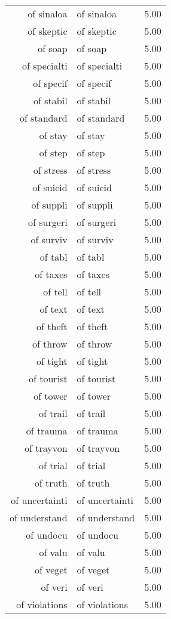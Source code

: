 \begin{table}[ht]
\begin{tabular}{rlr}
  of sinaloa & of sinaloa & 5.00 \\ 
  of skeptic & of skeptic & 5.00 \\ 
  of soap & of soap & 5.00 \\ 
  of specialti & of specialti & 5.00 \\ 
  of specif & of specif & 5.00 \\ 
  of stabil & of stabil & 5.00 \\ 
  of standard & of standard & 5.00 \\ 
  of stay & of stay & 5.00 \\ 
  of step & of step & 5.00 \\ 
  of stress & of stress & 5.00 \\ 
  of suicid & of suicid & 5.00 \\ 
  of suppli & of suppli & 5.00 \\ 
  of surgeri & of surgeri & 5.00 \\ 
  of surviv & of surviv & 5.00 \\ 
  of tabl & of tabl & 5.00 \\ 
  of taxes & of taxes & 5.00 \\ 
  of tell & of tell & 5.00 \\ 
  of text & of text & 5.00 \\ 
  of theft & of theft & 5.00 \\ 
  of throw & of throw & 5.00 \\ 
  of tight & of tight & 5.00 \\ 
  of tourist & of tourist & 5.00 \\ 
  of tower & of tower & 5.00 \\ 
  of trail & of trail & 5.00 \\ 
  of trauma & of trauma & 5.00 \\ 
  of trayvon & of trayvon & 5.00 \\ 
  of trial & of trial & 5.00 \\ 
  of truth & of truth & 5.00 \\ 
  of uncertainti & of uncertainti & 5.00 \\ 
  of understand & of understand & 5.00 \\ 
  of undocu & of undocu & 5.00 \\ 
  of valu & of valu & 5.00 \\ 
  of veget & of veget & 5.00 \\ 
  of veri & of veri & 5.00 \\ 
  of violations & of violations & 5.00 \\ 

\end{tabular}
\end{table}
